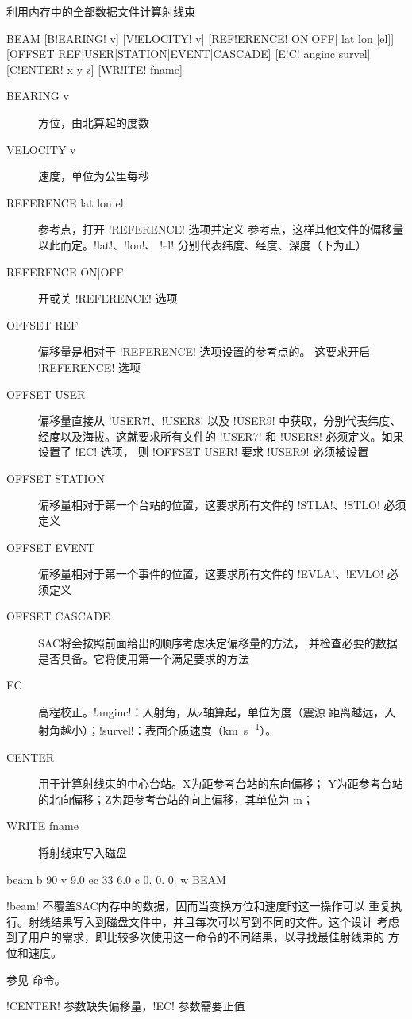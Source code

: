 \label{cmd:beam}

利用内存中的全部数据文件计算射线束

\begin{SACSTX}
BEAM [B!EARING! v] [V!ELOCITY! v] [REF!ERENCE! ON|OFF| lat lon [el]]
    [OFFSET REF|USER|STATION|EVENT|CASCADE] [E!C! anginc survel]
    [C!ENTER! x y z] [WR!ITE! fname]
\end{SACSTX}

\begin{description}
\item [BEARING v] 方位，由北算起的度数
\item [VELOCITY v] 速度，单位为公里每秒
\item [REFERENCE lat lon el] 参考点，打开 !REFERENCE! 选项并定义
    参考点，这样其他文件的偏移量以此而定。!lat!、!lon!、
    !el! 分别代表纬度、经度、深度（下为正）
\item [REFERENCE ON|OFF] 开或关 !REFERENCE! 选项
\item [OFFSET REF] 偏移量是相对于 !REFERENCE! 选项设置的参考点的。
    这要求开启 !REFERENCE! 选项
\item [OFFSET USER] 偏移量直接从 !USER7!、!USER8! 以及
    !USER9! 中获取，分别代表纬度、经度以及海拔。这就要求所有文件的
    !USER7! 和 !USER8! 必须定义。如果设置了 !EC! 选项，
    则 !OFFSET USER! 要求 !USER9! 必须被设置
\item [OFFSET STATION] 偏移量相对于第一个台站的位置，这要求所有文件的
    !STLA!、!STLO! 必须定义
\item [OFFSET EVENT] 偏移量相对于第一个事件的位置，这要求所有文件的
    !EVLA!、!EVLO! 必须定义
\item [OFFSET CASCADE] SAC将会按照前面给出的顺序考虑决定偏移量的方法，
    并检查必要的数据是否具备。它将使用第一个满足要求的方法
\item [EC] 高程校正。!anginc!：入射角，从z轴算起，单位为度（震源
    距离越远，入射角越小）；!survel!：表面介质速度（\si{\km\per\s}）。
\item [CENTER] 用于计算射线束的中心台站。X为距参考台站的东向偏移；
    Y为距参考台站的北向偏移；Z为距参考台站的向上偏移，其单位为 \si{\m}；
\item [WRITE fname] 将射线束写入磁盘
\end{description}

\begin{SACDFT}
beam  b 90  v 9.0 ec 33  6.0 c  0. 0. 0. w BEAM
\end{SACDFT}

!beam! 不覆盖SAC内存中的数据，因而当变换方位和速度时这一操作可以
重复执行。射线结果写入到磁盘文件中，并且每次可以写到不同的文件。这个设计
考虑到了用户的需求，即比较多次使用这一命令的不同结果，以寻找最佳射线束的
方位和速度。

参见  命令。

!CENTER! 参数缺失偏移量，!EC! 参数需要正值
